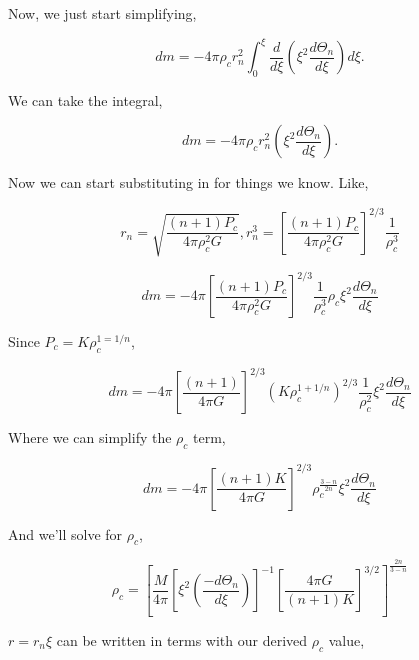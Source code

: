 \documentclass[12pt]{article}
\begin{document}
\noindent Now, we just start simplifying,

\begin{equation}
dm = -4\pi \rho_c r_n^2 \int_0^\xi \frac{d}{d\xi} \left( \xi^2 \frac{d\Theta_n}{d\xi} \right) d\xi.
\end{equation}

\noindent We can take the integral,

\begin{equation}
dm = -4\pi \rho_c r_n^2 \left( \xi^2 \frac{d\Theta_n}{d\xi} \right).
\end{equation}

\noindent Now we can start substituting in for things we know. Like,

\begin{equation}
r_n = \sqrt{\frac{\left( n + 1 \right)P_c}{4\pi\rho_c^2 G}}, r_n^3 = \left[ \frac{\left( n + 1 \right)P_c}{4\pi\rho_c^2 G} \right]^{2/3} \frac{1}{\rho_c^3}
\end{equation}

\begin{equation}
dm = -4\pi \left[ \frac{\left( n + 1 \right) P_c}{4\pi\rho_c^2 G} \right]^{2/3} \frac{1}{\rho_c^3} \rho_c \xi^2 \frac{d\Theta_n}{d\xi}
\end{equation}

\noindent Since $P_c = K \rho_c^{1 =1/n}$,

\begin{equation}
dm = -4\pi \left[ \frac{\left( n + 1 \right)}{4\pi G} \right]^{2/3} \left(K \rho_c^{1+ 1/n}\right)^{2/3}  \frac{1}{\rho_c^2}  \xi^2 \frac{d\Theta_n}{d\xi}
\end{equation}

\noindent Where we can simplify the $\rho_c$ term,


\begin{equation}
dm = -4\pi \left[ \frac{\left( n + 1 \right)K }{4\pi G} \right]^{2/3} \rho_c^{\frac{3-n}{2n}} \xi^2 \frac{d\Theta_n}{d\xi}
\end{equation}

\noindent And we'll solve for $\rho_c$, 

\begin{equation}
\rho_c = \left[ \frac{M}{4\pi} \left[\xi^2\left( \frac{-d\Theta_n}{d\xi}\right) \right]^{-1} \left[ \frac{4\pi G}{\left( n + 1 \right) K} \right]^{3/2} \right]^{\frac{2n}{3-n}}
\end{equation}

\noindent $r=r_n\xi$ can be written in terms with our derived $\rho_c$ value,
\end{document}

